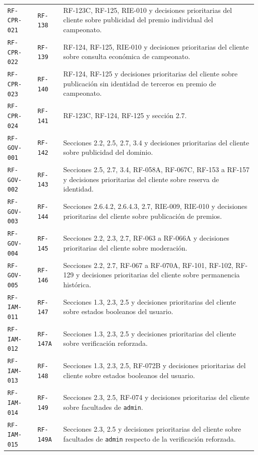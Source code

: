 \documentclass[10pt,letterpaper]{article}
\begin{document}
\begin{landscape}
\begin{longtable}{P{2.7cm}P{2.6cm}P{15.7cm}}
\texttt{RF-CPR-021} & \texttt{RF-138} & RF-123C, RF-125, RIE-010 y decisiones prioritarias del cliente sobre publicidad del premio individual del campeonato.\\
\texttt{RF-CPR-022} & \texttt{RF-139} & RF-124, RF-125, RIE-010 y decisiones prioritarias del cliente sobre consulta económica de campeonato.\\
\texttt{RF-CPR-023} & \texttt{RF-140} & RF-124, RF-125 y decisiones prioritarias del cliente sobre publicación sin identidad de terceros en premio de campeonato.\\
\texttt{RF-CPR-024} & \texttt{RF-141} & RF-123C, RF-124, RF-125 y sección 2.7.\\
\texttt{RF-GOV-001} & \texttt{RF-142} & Secciones 2.2, 2.5, 2.7, 3.4 y decisiones prioritarias del cliente sobre publicidad del dominio.\\
\texttt{RF-GOV-002} & \texttt{RF-143} & Secciones 2.5, 2.7, 3.4, RF-058A, RF-067C, RF-153 a RF-157 y decisiones prioritarias del cliente sobre reserva de identidad.\\
\texttt{RF-GOV-003} & \texttt{RF-144} & Secciones 2.6.4.2, 2.6.4.3, 2.7, RIE-009, RIE-010 y decisiones prioritarias del cliente sobre publicación de premios.\\
\texttt{RF-GOV-004} & \texttt{RF-145} & Secciones 2.2, 2.3, 2.7, RF-063 a RF-066A y decisiones prioritarias del cliente sobre moderación.\\
\texttt{RF-GOV-005} & \texttt{RF-146} & Secciones 2.2, 2.7, RF-067 a RF-070A, RF-101, RF-102, RF-129 y decisiones prioritarias del cliente sobre permanencia histórica.\\
\texttt{RF-IAM-011} & \texttt{RF-147} & Secciones 1.3, 2.3, 2.5 y decisiones prioritarias del cliente sobre estados booleanos del usuario.\\
\texttt{RF-IAM-012} & \texttt{RF-147A} & Secciones 1.3, 2.3, 2.5 y decisiones prioritarias del cliente sobre verificación reforzada.\\
\texttt{RF-IAM-013} & \texttt{RF-148} & Secciones 1.3, 2.3, 2.5, RF-072B y decisiones prioritarias del cliente sobre estados booleanos del usuario.\\
\texttt{RF-IAM-014} & \texttt{RF-149} & Secciones 2.3, 2.5, RF-074 y decisiones prioritarias del cliente sobre facultades de \texttt{admin}.\\
\texttt{RF-IAM-015} & \texttt{RF-149A} & Secciones 2.3, 2.5 y decisiones prioritarias del cliente sobre facultades de \texttt{admin} respecto de la verificación reforzada.\\

\end{longtable}
\end{landscape}
\end{document}
